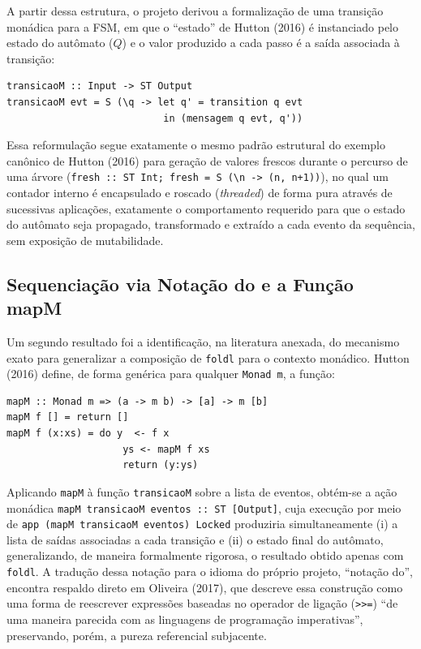\documentclass[12pt,a4paper]{article}
\begin{document}
A partir dessa estrutura, o projeto derivou a formalização de uma transição monádica para a FSM, em que o ``estado'' de Hutton (2016) é instanciado pelo estado do autômato ($Q$) e o valor produzido a cada passo é a saída associada à transição:

\begin{verbatim}
transicaoM :: Input -> ST Output
transicaoM evt = S (\q -> let q' = transition q evt
                           in (mensagem q evt, q'))
\end{verbatim}

Essa reformulação segue exatamente o mesmo padrão estrutural do exemplo canônico de Hutton (2016) para geração de valores frescos durante o percurso de uma árvore (\texttt{fresh :: ST Int; fresh = S (\textbackslash n -> (n, n+1))}), no qual um contador interno é encapsulado e roscado (\textit{threaded}) de forma pura através de sucessivas aplicações, exatamente o comportamento requerido para que o estado do autômato seja propagado, transformado e extraído a cada evento da sequência, sem exposição de mutabilidade.

\subsection{Sequenciação via Notação do e a Função mapM}

Um segundo resultado foi a identificação, na literatura anexada, do mecanismo exato para generalizar a composição de \texttt{foldl} para o contexto monádico. Hutton (2016) define, de forma genérica para qualquer \texttt{Monad m}, a função:

\begin{verbatim}
mapM :: Monad m => (a -> m b) -> [a] -> m [b]
mapM f [] = return []
mapM f (x:xs) = do y  <- f x
                    ys <- mapM f xs
                    return (y:ys)
\end{verbatim}

Aplicando \texttt{mapM} à função \texttt{transicaoM} sobre a lista de eventos, obtém-se a ação monádica \texttt{mapM transicaoM eventos :: ST [Output]}, cuja execução por meio de \texttt{app (mapM transicaoM eventos) Locked} produziria simultaneamente (i) a lista de saídas associadas a cada transição e (ii) o estado final do autômato, generalizando, de maneira formalmente rigorosa, o resultado obtido apenas com \texttt{foldl}. A tradução dessa notação para o idioma do próprio projeto, ``notação do'', encontra respaldo direto em Oliveira (2017), que descreve essa construção como uma forma de reescrever expressões baseadas no operador de ligação (\texttt{>>=}) ``de uma maneira parecida com as linguagens de programação imperativas'', preservando, porém, a pureza referencial subjacente.
\end{document}
